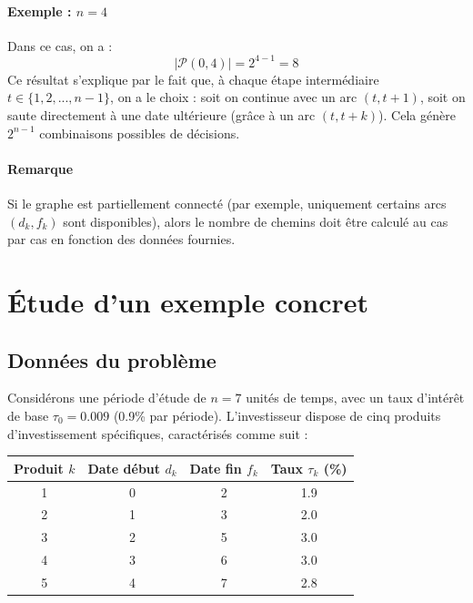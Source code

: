 \documentclass[a4paper,11pt]{article}
\begin{document}
    \paragraph{Exemple : $n = 4$} 
    Dans ce cas, on a :
    \[
    |\mathcal{P}(0, 4)| = 2^{4-1} = 8
    \]
    Ce résultat s’explique par le fait que, à chaque étape intermédiaire $t \in \{1, 2, ..., n-1\}$, on a le choix : soit on continue avec un arc $(t, t+1)$, soit on saute directement à une date ultérieure (grâce à un arc $(t, t+k)$). Cela génère $2^{n-1}$ combinaisons possibles de décisions.

    \paragraph{Remarque} 
    Si le graphe est partiellement connecté (par exemple, uniquement certains arcs $(d_k, f_k)$ sont disponibles), alors le nombre de chemins doit être calculé au cas par cas en fonction des données fournies.


    \section{Étude d’un exemple concret}

    \subsection{Données du problème}

    Considérons une période d’étude de $n = 7$ unités de temps, avec un taux d’intérêt de base $\tau_0 = 0.009$ (0.9\% par période). L’investisseur dispose de cinq produits d’investissement spécifiques, caractérisés comme suit :

    \begin{center}
        \begin{tabular}{|c|c|c|c|}
        \hline
        Produit $k$ & Date début $d_k$ & Date fin $f_k$ & Taux $\tau_k$ (\%) \\
        \hline
        1 & 0 & 2 & 1.9 \\
        2 & 1 & 3 & 2.0 \\
        3 & 2 & 5 & 3.0 \\
        4 & 3 & 6 & 3.0 \\
        5 & 4 & 7 & 2.8 \\
        \hline
        \end{tabular}
    \end{center}
\end{document}
